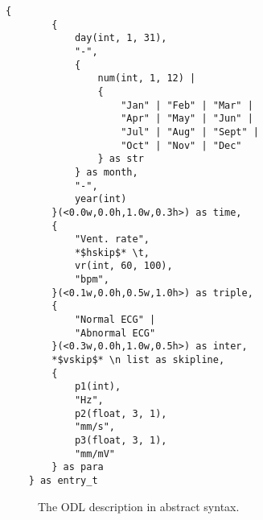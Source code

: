 \newsavebox{\absflisting}
\begin{lrbox}{\absflisting}%
\begin{lstlisting}[basicstyle=\tiny,]
    {
        {
            day(int, 1, 31),
            "-",
            {
                num(int, 1, 12) |
                {
                    "Jan" | "Feb" | "Mar" |
                    "Apr" | "May" | "Jun" |
                    "Jul" | "Aug" | "Sept" |
                    "Oct" | "Nov" | "Dec"
                } as str
            } as month,
            "-",
            year(int)
        }(<0.0w,0.0h,1.0w,0.3h>) as time,
        {
            "Vent. rate",
            *$hskip$* \t,
            vr(int, 60, 100),
            "bpm",
        }(<0.1w,0.0h,0.5w,1.0h>) as triple,
        {
            "Normal ECG" |
            "Abnormal ECG"
        }(<0.3w,0.0h,1.0w,0.5h>) as inter,
        *$vskip$* \n list as skipline,
        {
            p1(int),
            "Hz",
            p2(float, 3, 1),
            "mm/s",
            p3(float, 3, 1),
            "mm/mV"
        } as para
    } as entry_t
\end{lstlisting}
\end{lrbox}



\begin{figure}[ht]
\centering
\subfloat{
\scalebox{1.5}{\usebox{\absflisting}}
}
\caption{The ODL description in abstract syntax.}
\label{fig:running-odl-abstract}
\end{figure}
